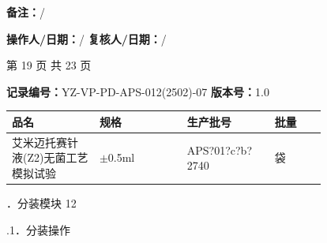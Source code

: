 \documentclass[UTF8,10pt,a4paper,fontset=fandol]{ctexart}
\newcommand{\fieldvalue}[1]{#1}
\newcommand{\handwritten}[1]{#1}
\begin{document}
\vspace{0.08cm}

\noindent
\textbf{备注：}\handwritten{/}

\vspace{0.08cm}

\noindent
\textbf{操作人/日期：}\handwritten{/}
\hfill
\textbf{复核人/日期：}\handwritten{/}

\vfill

\begin{center}
第 19 页 共 23 页
\end{center}

\newpage

\noindent\textbf{记录编号：}YZ-VP-PD-APS-012(2502)-07\qquad
\textbf{版本号：}1.0

\vspace{2mm}

\begin{center}
\begin{tabular}{|p{0.22\linewidth}|p{0.22\linewidth}|p{0.22\linewidth}|p{0.13\linewidth}|}
\hline
\centering 品名 & \centering 规格 & \centering 生产批号 & \centering 批量 \tabularnewline
\hline
\centering \fieldvalue{艾米迈托赛针液(Z2)无菌工艺模拟试验} &
\centering \fieldvalue{12.5$\pm$0.5ml} &
\centering \fieldvalue{\handwritten{APS?01?c?b? 2740}} &
\centering 袋
\tabularnewline
\hline
\end{tabular}
\end{center}

．分装模块 12

.1．分装操作
\end{document}
